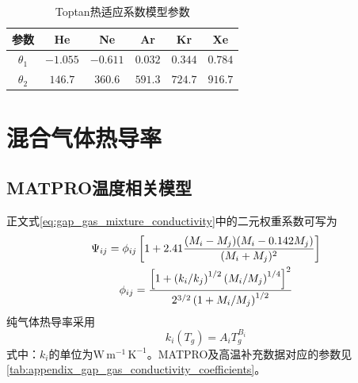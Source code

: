 \begin{table}[htbp]
	\centering
	\caption{Toptan热适应系数模型参数\cite{toptanModelingGapConductance2020}}
	\label{tab:appendix_gap_toptan_accommodation_parameters}
	
	\begin{tabular*}{\textwidth}{
			@{\extracolsep{\fill}}
			cccccc
			@{}
		}
		\toprule
		参数 & He & Ne & Ar & Kr & Xe \\
		\midrule
		$\theta_1$ & $-1.055$ & $-0.611$ & $0.032$ & $0.344$ & $0.784$ \\
		$\theta_2$ & $146.7$ & $360.6$ & $591.3$ & $724.7$ & $916.7$ \\
		\bottomrule
	\end{tabular*}
\end{table}

\section{混合气体热导率}

\subsection{MATPRO温度相关模型}
\label{app:gap_default_gas_conductivity}

正文式\eqref{eq:gap_gas_mixture_conductivity}中的二元权重系数可写为\cite{brokawApproximateFormulasViscosity1958,hagrmanSCDAPRELAP5MOD1995}
\begin{gather}
	\Psi_{ij}
	=\phi_{ij}
	\left[
	1+2.41
	\frac{(M_i-M_j)(M_i-0.142M_j)}{(M_i+M_j)^2}
	\right]
	\notag
	\\
	\phi_{ij}
	=\frac{
		\left[
		1+\left(k_i/k_j\right)^{1/2}
		\left(M_i/M_j\right)^{1/4}
		\right]^2}
	{2^{3/2}\left(1+M_i/M_j\right)^{1/2}}
	\label{eq:appendix_gap_brokaw_weights}
\end{gather}
纯气体热导率采用
\begin{equation}
	k_i(T_g)=A_iT_g^{B_i}
	\label{eq:appendix_gap_pure_gas_conductivity}
\end{equation}
式中：$k_i$的单位为$\mathrm{W\,m^{-1}\,K^{-1}}$。MATPRO及高温补充数据对应的参数见\tablename\ref{tab:appendix_gap_gas_conductivity_coefficients}\cite{hagrmanSCDAPRELAP5MOD1995,springerThermalConductivityNeon1973}。

